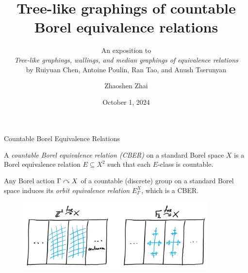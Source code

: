 \documentclass{beamer}
\title{\normalsize{Tree-like graphings of countable Borel equivalence relations}}
\subtitle{\scriptsize{An exposition to\\\textit{Tree-like graphings, wallings, and median graphings of equivalence relations}\\by Ruiyuan Chen, Antoine Poulin, Ran Tao, and Anush Tserunyan}}
\author{\small Zhaoshen Zhai}
\date{\footnotesize October 1, 2024}
\begin{document}
\frame{\titlepage}
    \begin{frame}{Countable Borel Equivalence Relations}
        \begin{definition}
            A \textit{countable Borel equivalence relation (CBER)} on a standard Borel space $X$ is a Borel equivalence relation $E\subseteq X^2$ such that each $E$-class is countable.
        \end{definition}

        \pause
        \vspace{-0.1in}

        \begin{example}
            Any Borel action $\Gamma\curvearrowright X$ of a countable (discrete) group on a standard Borel space induces its \textit{orbit equivalence relation} $E^X_\Gamma$, which is a CBER.
        \end{example}

        \pause
        \vspace{-0.15in}

        \begin{figure}[h]
            \center
            \includegraphics[width=0.9\textwidth]{img/group_action.png}
        \end{figure}
    \end{frame}
\end{document}
